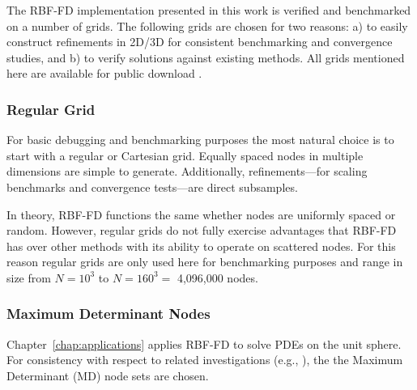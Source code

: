 \documentclass[11pt]{report}
\begin{document}
{%

The RBF-FD implementation presented in this work is verified and benchmarked on a number of grids. The following grids are chosen for two reasons: a) to easily construct refinements in 2D/3D for consistent benchmarking and convergence studies, and b) to verify solutions against existing methods. All grids mentioned here are available for public download \cite{BolligSphereGrids}.


\subsubsection{Regular Grid}
For basic debugging and benchmarking purposes the most natural choice is to start with a regular or Cartesian grid. Equally spaced nodes in multiple dimensions are simple to generate. Additionally, refinements---for scaling benchmarks and convergence tests---are direct subsamples. 

In theory, RBF-FD functions the same whether nodes are uniformly spaced or random. However, regular grids do not fully exercise advantages that RBF-FD has over other methods with its ability to operate on scattered nodes. For this reason regular grids are only used here for benchmarking purposes and range in size from $N=10^3$ to $N=160^3 =$ 4,096,000 nodes. 



\subsubsection{Maximum Determinant Nodes}

Chapter~\ref{chap:applications} applies RBF-FD to solve PDEs on the unit sphere. For consistency with respect to related investigations (e.g., \cite{Fornberg2009a, Fornberg2007,FornbergLehto11}), the the Maximum Determinant (MD) node sets \cite{Womersley2001, Sloan2003} are chosen. 

}
\end{document}

